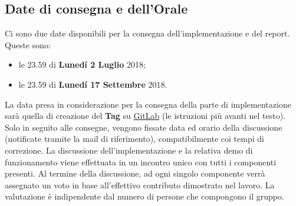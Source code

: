 \subsection{Date di consegna e dell'Orale}
 Ci sono due date disponibili per la consegna dell'implementazione e del report. Queste sono:
\begin{itemize}
    \item le 23.59 di \textbf{Lunedí 2 Luglio} 2018;
    \item le 23.59 di \textbf{Lunedí 17 Settembre} 2018.
\end{itemize}
La data presa in considerazione per la consegna della parte di implementazione sarà quella di creazione del \textbf{Tag} su \href{https://gitlab.com}{GitLab} (le istruzioni più avanti nel testo). Solo in seguito alle consegne, vengono fissate data ed orario della discussione (notificate tramite la mail di riferimento), compatibilmente coi tempi di correzione.
La discussione dell'implementazione e la relativa demo di funzionamento viene effettuata in un incontro unico con tutti i componenti presenti. Al termine della discussione, ad ogni singolo componente verrà assegnato un voto in base all'effettivo contributo dimostrato nel lavoro. La valutazione è indipendente dal numero di persone che compongono il gruppo.

